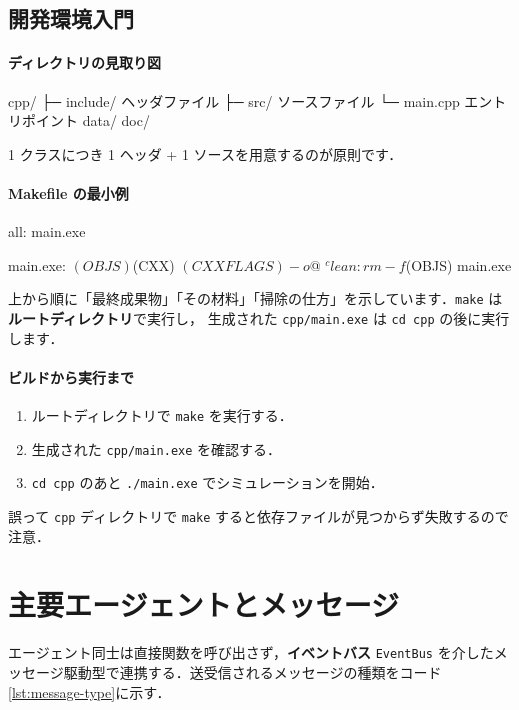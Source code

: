 \documentclass[10pt,letterpaper]{jsarticle}
\begin{document}
\subsection{開発環境入門}\label{sec:devintro}
\paragraph{ディレクトリの見取り図}
\begin{cmdcode}
cpp/
 ├─ include/   ヘッダファイル
 ├─ src/       ソースファイル
 └─ main.cpp   エントリポイント
data/
doc/
\end{cmdcode}
1 クラスにつき 1 ヘッダ + 1 ソースを用意するのが原則です．

\paragraph{Makefile の最小例}
\begin{cmdcode}
all: main.exe

main.exe: $(OBJS)
    $(CXX) $(CXXFLAGS) -o $@ $^

clean:
    rm -f $(OBJS) main.exe
\end{cmdcode}
上から順に「最終成果物」「その材料」「掃除の仕方」を示しています．\texttt{make} は \textbf{ルートディレクトリ}で実行し，
生成された \texttt{cpp/main.exe} は \texttt{cd cpp} の後に実行します．

\paragraph{ビルドから実行まで}
\begin{enumerate}
  \item ルートディレクトリで \texttt{make} を実行する．
  \item 生成された \texttt{cpp/main.exe} を確認する．
  \item \texttt{cd cpp} のあと \texttt{./main.exe} でシミュレーションを開始．
\end{enumerate}
誤って \texttt{cpp} ディレクトリで \texttt{make} すると依存ファイルが見つからず失敗するので注意．

\section{主要エージェントとメッセージ}
エージェント同士は直接関数を呼び出さず，\textbf{イベントバス} \texttt{EventBus} を介したメッセージ駆動型で連携する．送受信されるメッセージの種類をコード\ref{lst:message-type}に示す．
\end{document}
